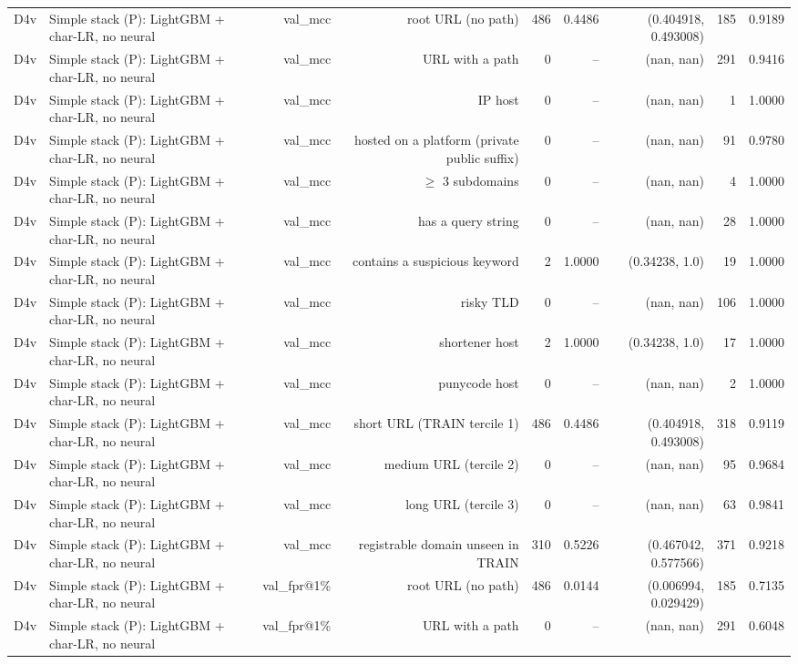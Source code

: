 \begin{table}[t]
\begin{tabular}{llrrrrrrr}
D4v & Simple stack (P): LightGBM + char-LR, no neural & val\_mcc & root URL (no path) & 486 & 0.4486 & (0.404918, 0.493008) & 185 & 0.9189 \\
D4v & Simple stack (P): LightGBM + char-LR, no neural & val\_mcc & URL with a path & 0 & -- & (nan, nan) & 291 & 0.9416 \\
D4v & Simple stack (P): LightGBM + char-LR, no neural & val\_mcc & IP host & 0 & -- & (nan, nan) & 1 & 1.0000 \\
D4v & Simple stack (P): LightGBM + char-LR, no neural & val\_mcc & hosted on a platform (private public suffix) & 0 & -- & (nan, nan) & 91 & 0.9780 \\
D4v & Simple stack (P): LightGBM + char-LR, no neural & val\_mcc & $\geq$ 3 subdomains & 0 & -- & (nan, nan) & 4 & 1.0000 \\
D4v & Simple stack (P): LightGBM + char-LR, no neural & val\_mcc & has a query string & 0 & -- & (nan, nan) & 28 & 1.0000 \\
D4v & Simple stack (P): LightGBM + char-LR, no neural & val\_mcc & contains a suspicious keyword & 2 & 1.0000 & (0.34238, 1.0) & 19 & 1.0000 \\
D4v & Simple stack (P): LightGBM + char-LR, no neural & val\_mcc & risky TLD & 0 & -- & (nan, nan) & 106 & 1.0000 \\
D4v & Simple stack (P): LightGBM + char-LR, no neural & val\_mcc & shortener host & 2 & 1.0000 & (0.34238, 1.0) & 17 & 1.0000 \\
D4v & Simple stack (P): LightGBM + char-LR, no neural & val\_mcc & punycode host & 0 & -- & (nan, nan) & 2 & 1.0000 \\
D4v & Simple stack (P): LightGBM + char-LR, no neural & val\_mcc & short URL (TRAIN tercile 1) & 486 & 0.4486 & (0.404918, 0.493008) & 318 & 0.9119 \\
D4v & Simple stack (P): LightGBM + char-LR, no neural & val\_mcc & medium URL (tercile 2) & 0 & -- & (nan, nan) & 95 & 0.9684 \\
D4v & Simple stack (P): LightGBM + char-LR, no neural & val\_mcc & long URL (tercile 3) & 0 & -- & (nan, nan) & 63 & 0.9841 \\
D4v & Simple stack (P): LightGBM + char-LR, no neural & val\_mcc & registrable domain unseen in TRAIN & 310 & 0.5226 & (0.467042, 0.577566) & 371 & 0.9218 \\
D4v & Simple stack (P): LightGBM + char-LR, no neural & val\_fpr@1\% & root URL (no path) & 486 & 0.0144 & (0.006994, 0.029429) & 185 & 0.7135 \\
D4v & Simple stack (P): LightGBM + char-LR, no neural & val\_fpr@1\% & URL with a path & 0 & -- & (nan, nan) & 291 & 0.6048 \\

\end{tabular}
\end{table}
